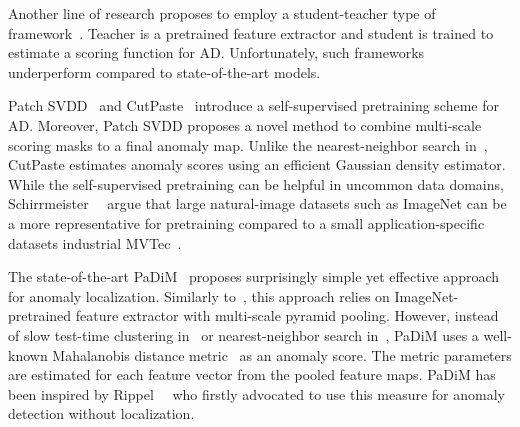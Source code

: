 \documentclass[10pt,twocolumn,letterpaper]{article}
\begin{document}
Another line of research proposes to employ a student-teacher type of framework~\cite{Bergmann_2020_CVPR, salehi2020multiresolution, wang2021studentteacher}. Teacher is a pretrained feature extractor and student is trained to estimate a scoring function for AD. Unfortunately, such frameworks underperform compared to state-of-the-art models.

Patch SVDD~\cite{Yi_2020_ACCV} and CutPaste~\cite{li2021cutpaste} introduce a self-supervised pretraining scheme for AD. Moreover, Patch SVDD proposes a novel method to combine multi-scale scoring masks to a final anomaly map. Unlike the nearest-neighbor search in~\cite{Yi_2020_ACCV}, CutPaste estimates anomaly scores using an efficient Gaussian density estimator. While the self-supervised pretraining can be helpful in uncommon data domains, Schirrmeister~\etal~\cite{schirrmeister2020understanding} argue that large natural-image datasets such as ImageNet can be a more representative for pretraining compared to a small application-specific datasets \eg industrial MVTec~\cite{Bergmann_2019_CVPR}.

The state-of-the-art PaDiM~\cite{defard2020padim} proposes surprisingly simple yet effective approach for anomaly localization. Similarly to~\cite{DFR2020, cohen2021subimage, Yi_2020_ACCV}, this approach relies on ImageNet-pretrained feature extractor with multi-scale pyramid pooling. However, instead of slow test-time clustering in~\cite{cohen2021subimage} or nearest-neighbor search in~\cite{Yi_2020_ACCV}, PaDiM uses a well-known Mahalanobis distance metric~\cite{mahalanobis1936generalized} as an anomaly score. The metric parameters are estimated for each feature vector from the pooled feature maps. PaDiM has been inspired by Rippel~\etal~\cite{rippel2020modeling} who firstly advocated to use this measure for anomaly detection without localization.
\end{document}
